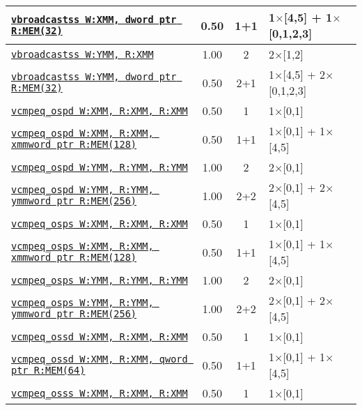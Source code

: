 \documentclass[a4paper,english,fontsize=9]{scrartcl}
\begin{document}
\begin{longtable}{p{}ccL{.25\textwidth}}
  \midrule
  \texttt{\href{https://felixcloutier.com/x86/VBROADCAST.html}{vbroadcastss W:XMM, dword ptr R:MEM(32)}} & 0.50 & 1+1 & 1\(\times\)[4,5] + 1\(\times\)[0,1,2,3] \\
  \midrule
  \texttt{\href{https://felixcloutier.com/x86/VBROADCAST.html}{vbroadcastss W:YMM, R:XMM}} & 1.00 & 2 & 2\(\times\)[1,2] \\
  \midrule
  \texttt{\href{https://felixcloutier.com/x86/VBROADCAST.html}{vbroadcastss W:YMM, dword ptr R:MEM(32)}} & 0.50 & 2+1 & 1\(\times\)[4,5] + 2\(\times\)[0,1,2,3] \\
  \midrule
  \texttt{\href{https://felixcloutier.com/x86/CMPPD.html}{vcmpeq\_ospd W:XMM, R:XMM, R:XMM}} & 0.50 & 1 & 1\(\times\)[0,1] \\
  \midrule
  \texttt{\href{https://felixcloutier.com/x86/CMPPD.html}{vcmpeq\_ospd W:XMM, R:XMM, xmmword ptr R:MEM(128)}} & 0.50 & 1+1 & 1\(\times\)[0,1] + 1\(\times\)[4,5] \\
  \midrule
  \texttt{\href{https://felixcloutier.com/x86/CMPPD.html}{vcmpeq\_ospd W:YMM, R:YMM, R:YMM}} & 1.00 & 2 & 2\(\times\)[0,1] \\
  \midrule
  \texttt{\href{https://felixcloutier.com/x86/CMPPD.html}{vcmpeq\_ospd W:YMM, R:YMM, ymmword ptr R:MEM(256)}} & 1.00 & 2+2 & 2\(\times\)[0,1] + 2\(\times\)[4,5] \\
  \midrule
  \texttt{\href{https://felixcloutier.com/x86/CMPPS.html}{vcmpeq\_osps W:XMM, R:XMM, R:XMM}} & 0.50 & 1 & 1\(\times\)[0,1] \\
  \midrule
  \texttt{\href{https://felixcloutier.com/x86/CMPPS.html}{vcmpeq\_osps W:XMM, R:XMM, xmmword ptr R:MEM(128)}} & 0.50 & 1+1 & 1\(\times\)[0,1] + 1\(\times\)[4,5] \\
  \midrule
  \texttt{\href{https://felixcloutier.com/x86/CMPPS.html}{vcmpeq\_osps W:YMM, R:YMM, R:YMM}} & 1.00 & 2 & 2\(\times\)[0,1] \\
  \midrule
  \texttt{\href{https://felixcloutier.com/x86/CMPPS.html}{vcmpeq\_osps W:YMM, R:YMM, ymmword ptr R:MEM(256)}} & 1.00 & 2+2 & 2\(\times\)[0,1] + 2\(\times\)[4,5] \\
  \midrule
  \texttt{\href{https://felixcloutier.com/x86/CMPSD.html}{vcmpeq\_ossd W:XMM, R:XMM, R:XMM}} & 0.50 & 1 & 1\(\times\)[0,1] \\
  \midrule
  \texttt{\href{https://felixcloutier.com/x86/CMPSD.html}{vcmpeq\_ossd W:XMM, R:XMM, qword ptr R:MEM(64)}} & 0.50 & 1+1 & 1\(\times\)[0,1] + 1\(\times\)[4,5] \\
  \midrule
  \texttt{\href{https://felixcloutier.com/x86/CMPSS.html}{vcmpeq\_osss W:XMM, R:XMM, R:XMM}} & 0.50 & 1 & 1\(\times\)[0,1] \\

\end{longtable}
\end{document}
